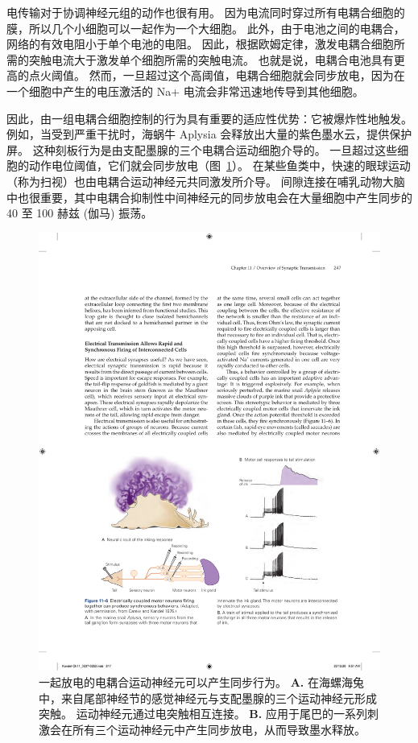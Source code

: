 电传输对于协调神经元组的动作也很有用。
因为电流同时穿过所有电耦合细胞的膜，所以几个小细胞可以一起作为一个大细胞。
此外，由于电池之间的电耦合，网络的有效电阻小于单个电池的电阻。
因此，根据欧姆定律，激发电耦合细胞所需的突触电流大于激发单个细胞所需的突触电流。
也就是说，电耦合电池具有更高的点火阈值。
然而，一旦超过这个高阈值，电耦合细胞就会同步放电，因为在一个细胞中产生的电压激活的 Na+ 电流会非常迅速地传导到其他细胞。


因此，由一组电耦合细胞控制的行为具有重要的适应性优势：它被爆炸性地触发。
例如，当受到严重干扰时，海蜗牛 Aplysia 会释放出大量的紫色墨水云，提供保护屏。
这种刻板行为是由支配墨腺的三个电耦合运动细胞介导的。 一旦超过这些细胞的动作电位阈值，它们就会同步放电（图~\ref{fig:11_6}）。
在某些鱼类中，快速的眼球运动（称为扫视）也由电耦合运动神经元共同激发所介导。
间隙连接在哺乳动物大脑中也很重要，其中电耦合抑制性中间神经元的同步放电会在大量细胞中产生同步的 40 至 100 赫兹 (伽马) 振荡。


\begin{figure}[htbp]
	\centering
	\includegraphics[width=0.8\linewidth]{chap11/fig_11_6}
	\caption{一起放电的电耦合运动神经元可以产生同步行为\cite{carew1976two}。 
		\textbf{A.} 在海螺海兔中，来自尾部神经节的感觉神经元与支配墨腺的三个运动神经元形成突触。
		运动神经元通过电突触相互连接。
		\textbf{B.} 应用于尾巴的一系列刺激会在所有三个运动神经元中产生同步放电，从而导致墨水释放。}
	\label{fig:11_6}
\end{figure}


